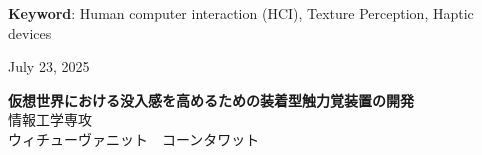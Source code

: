 \documentclass[uplatex,
12pt, %
a4paper,
english, %
oneside,
titlepage,
singlespacing, %
liststotoc, %
headsepline,
]{MastersDoctoralThesis} %
\begin{document}
\textbf{Keyword}: Human computer interaction (HCI), Texture Perception, Haptic devices

\vspace{2cm} %
\begin{center}
      {July 23, 2025} %
\end{center}




\clearpage

\begin{center}
    \vspace*{1cm} %
    \begin{CJK*}{UTF8}{min}
      {\Large \textbf{仮想世界における没入感を高めるための装着型触力覚装置の開発}} \\ %
      \vspace{1.5cm} %
      {情報工学専攻} \\ %
      {ウィチューヴァニット　コーンタワット} \\ %
      {}
    \end{CJK*}
    \vspace*{2cm} %

\end{center}
\end{document}
